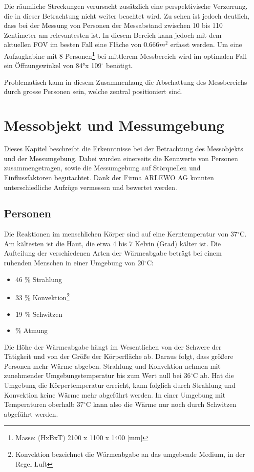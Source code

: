 Die räumliche Streckungen verursacht zusätzlich eine perspektivische Verzerrung, die in dieser Betrachtung nicht weiter beachtet wird. Zu sehen ist jedoch deutlich, dass bei der Messung von Personen der Messabstand zwischen 10 bis 110 Zentimeter am relevantesten ist. In diesem Bereich kann jedoch mit dem aktuellen \ac{FOV} im besten Fall eine Fläche von 0.666$m^2$ erfasst werden. Um eine Aufzugkabine mit 8 Personen\footnote[6]{Masse: (HxBxT) 2100 x 1100 x 1400 [mm]} bei mittlerem Messbereich wird im optimalen Fall ein Öffnungswinkel von 84°x 109$^\circ$ benötigt. 

Problematisch kann in diesem Zusammenhang die Abschattung des Messbereichs durch grosse Personen sein, welche zentral positioniert sind.

\section{Messobjekt und Messumgebung}
\label{sec:Messobjekt}
Dieses Kapitel beschreibt die Erkenntnisse bei der Betrachtung des Messobjekts und der Messumgebung. Dabei wurden einerseits die Kennwerte von Personen zusammengetragen, sowie die Messumgebung auf Störquellen und Einflussfaktoren begutachtet. Dank der Firma ARLEWO AG konnten unterschiedliche Aufzüge vermessen und bewertet werden. 

\subsection{Personen}
\label{subsec:Personen}
Die Reaktionen im menschlichen Körper sind auf eine Kerntemperatur von 37$^\circ$C. Am kältesten ist die Haut, die etwa 4 bis 7 Kelvin (Grad) kälter ist. Die Aufteilung der verschiedenen Arten der Wärmeabgabe beträgt bei einem ruhenden Menschen in einer Umgebung von 20$^\circ$C:
\begin{itemize}
	\item 46 \% Strahlung
	\item 33 \% Konvektion\footnote[7]{Konvektion bezeichnet die Wärmeabgabe an
		das umgebende Medium, in der Regel Luft}
	\item 19 \% Schwitzen
	\item {} \% Atmung
\end{itemize}

Die Höhe der Wärmeabgabe hängt im Wesentlichen von der Schwere der Tätigkeit und von der Größe der Körperfläche ab. Daraus folgt, dass größere Personen mehr Wärme abgeben. Strahlung und Konvektion nehmen mit zunehmender Umgebungstemperatur bis zum Wert null bei 36$^\circ$C ab. Hat die Umgebung die Körpertemperatur erreicht, kann folglich durch Strahlung und Konvektion keine Wärme mehr abgeführt werden. In einer Umgebung mit Temperaturen oberhalb 37$^\circ$C kann also die Wärme nur noch durch Schwitzen abgeführt werden.\protect\cite{MenschWaerme}

